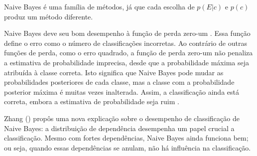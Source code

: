 Naive Bayes é uma família de métodos, já que cada escolha de $p(E|c)$ e $p(c)$ produz um método diferente.

Naive Bayes deve seu bom desempenho à função de perda zero-um . Essa função define o erro como o número de classificações incorretas. Ao contrário de outras funções de perda, como o erro quadrado, a função de perda zero-um não penaliza a estimativa de probabilidade imprecisa, desde que a probabilidade máxima seja atribuída à classe correta. Isto significa que Naive Bayes pode mudar as probabilidades posteriores de cada classe, mas a classe com a probabilidade posterior máxima é muitas vezes inalterada. Assim, a classificação ainda está correta, embora a estimativa de probabilidade seja ruim .


Zhang (\citeyear{zhang2004}) propôs uma nova explicação sobre o desempenho de classificação de Naive Bayes: a distribuição de dependência desempenha um papel crucial a classificação. Mesmo com fortes dependências, Naive Bayes ainda funciona bem; ou seja, quando essas dependências se anulam, não há influência na classificação. 







